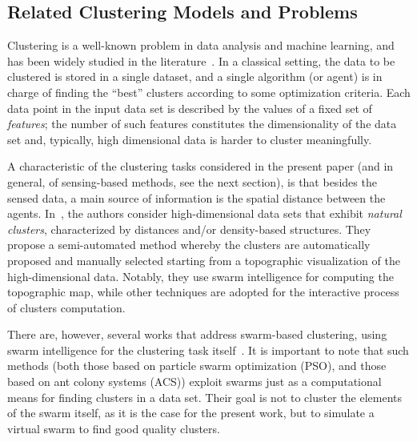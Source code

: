 \subsection{Related Clustering Models and Problems}
\label{s:rw:related-problems}


Clustering is a well-known problem in data analysis and machine learning, and has been widely studied in the literature~\cite{Jain:1999,DBLP:journals/sigkdd/Estivill-Castro02,Jain:2010}.
 In a classical setting, the data to be clustered is stored in a single dataset, and a single algorithm (or agent) is in charge of finding the ``best'' clusters according to some optimization criteria.
 Each data point in the input data set is described by the values of a fixed set of {\em features}; the number of such features constitutes the dimensionality of the data set and, typically, high dimensional data is harder to cluster meaningfully.

A characteristic of the clustering tasks considered in the present paper (and in general, of sensing-based methods, see the next section), is that besides the sensed data,
 a main source of information is the spatial distance between the agents. In~\cite{Thrun:2021}, the authors consider high-dimensional data sets that exhibit {\em natural clusters}, characterized by distances and/or density-based structures.
 They propose a semi-automated method whereby the clusters are automatically proposed and manually selected starting from a topographic visualization of the high-dimensional data.
 Notably, they use swarm intelligence for computing the topographic map, while other techniques are adopted for the interactive process of clusters computation.

There are, however, several works that address swarm-based clustering, using swarm intelligence for the clustering task itself~\cite{Martens:2011}.
 It is important to note that such methods (both those based on particle swarm optimization (PSO), and those based on ant colony systems (ACS)) exploit swarms just as a computational means for finding clusters in a data set.
 Their goal is not to cluster the elements of the swarm itself, as it is the case for the present work, but to simulate a virtual swarm to find good quality clusters.

